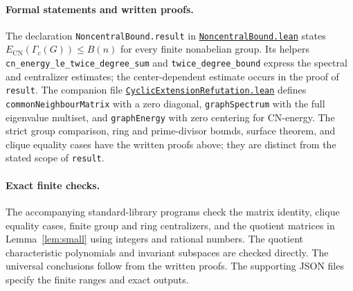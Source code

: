 \documentclass[11pt]{article}
\newcommand{\ECN}{E_{\mathrm{CN}}}
\begin{document}
\paragraph{Formal statements and written proofs.}
The declaration \texttt{NoncentralBound.result} in
\href{https://github.com/the-omega-institute/trureturing/blob/b3bd002bc644799939f299fe6c6c26195e3bb998/D5/S3/Combinatorics/Graph/CommonNeighborhood/NoncentralBound.lean}{\texttt{NoncentralBound.lean}}
states $\ECN(\Gamma_c(G))\le B(n)$ for every finite nonabelian group.
Its helpers \texttt{cn\_energy\_le\_twice\_degree\_sum} and
\texttt{twice\_degree\_bound} express the spectral and centralizer estimates;
the center-dependent estimate occurs in the proof of \texttt{result}.
The companion file
\href{https://github.com/the-omega-institute/trureturing/blob/b3bd002bc644799939f299fe6c6c26195e3bb998/D5/S3/Combinatorics/Graph/SubgroupGenerating/CyclicExtensionRefutation.lean}{\texttt{CyclicExtensionRefutation.lean}}
defines \texttt{commonNeighbourMatrix} with a zero diagonal,
\texttt{graphSpectrum} with the full eigenvalue multiset, and
\texttt{graphEnergy} with zero centering for CN-energy.
The strict group comparison, ring and prime-divisor bounds,
surface theorem, and clique equality cases have the written proofs above;
they are distinct from the stated scope of \texttt{result}.

\paragraph{Exact finite checks.}
The accompanying standard-library programs check the matrix identity,
clique equality cases, finite group and ring centralizers, and the quotient
matrices in Lemma~\ref{lem:small} using integers and rational numbers.
The quotient characteristic polynomials and invariant subspaces are checked
directly. The universal conclusions follow from the written proofs.
The supporting JSON files specify the finite ranges and exact outputs.
\end{document}
